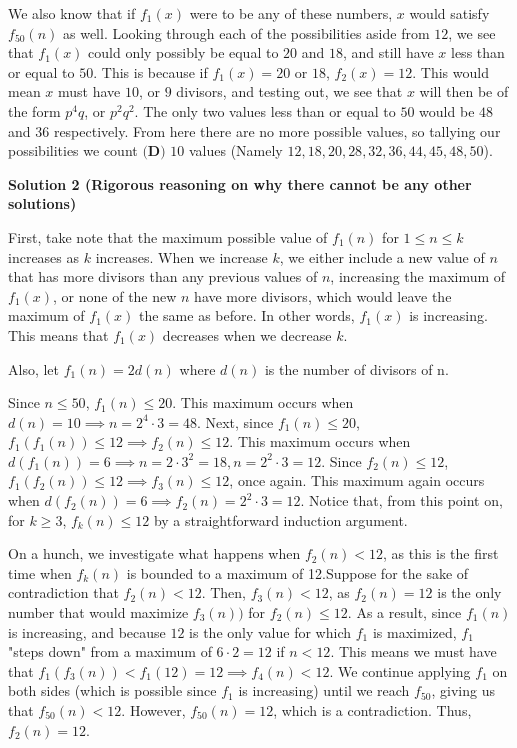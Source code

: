 \begin{enumerate}
 We also know that if $f_1(x)$ were to be any of these numbers, $x$ would satisfy $f_{50}(n)$ as well. Looking through each of the possibilities aside from $12$, we see that $f_1(x)$ could only possibly be equal to $20$ and $18$, and still have $x$ less than or equal to $50$. This is because if $f_1(x)=20$ or $18$, $f_2 (x) = 12$. This would mean $x$ must have $10$, or $9$ divisors, and testing out, we see that $x$ will then be of the form $p^4q$, or $p^2q^2$. The only two values less than or equal to $50$ would be $48$ and $36$ respectively. From here there are no more possible values, so tallying our possibilities we count $\boxed{\textbf{(D) }10}$ values (Namely $12,18,20,28,32,36,44,45,48,50$).

 



\textbf{Solution 2 (Rigorous reasoning on why there cannot be any other solutions)}

First, take note that the maximum possible value of $f_1(n)$ for $1 \le n \le k$ increases as $k$ increases. When we increase $k$, we either include a new value of $n$ that has more divisors than any previous values of $n$, increasing the maximum of $f_1(x)$, or none of the new $n$ have more divisors, which would leave the maximum of $f_1(x)$ the same as before. In other words, $f_1(x)$ is increasing. This means that $f_1(x)$ decreases when we decrease $k$. 

 Also, let $f_1(n) = 2d(n)$ where $d(n)$ is the number of divisors of n.

 Since $n \le 50$, $f_1(n) \le 20$. This maximum occurs when $d(n) = 10 \implies n = 2^4 \cdot 3 = 48$. Next, since $f_1(n) \le 20$, $f_1(f_1(n)) \le 12 \implies f_2(n) \le 12$. This maximum occurs when $d(f_1(n)) = 6 \implies n = 2 \cdot 3^2 = 18, n = 2^2 \cdot 3 = 12$. Since $f_2(n) \le 12$, $f_1(f_2(n)) \le 12 \implies f_3(n) \le 12$, once again. This maximum again occurs when $d(f_2(n)) = 6 \implies f_2(n) = 2^2 \cdot 3 = 12$. Notice that, from this point on, for $k \geq 3$, $f_k(n) \leq 12$ by a straightforward induction argument.

 On a hunch, we investigate what happens when $f_2(n) < 12$, as this is the first time when $f_k(n)$ is bounded to a maximum of 12.Suppose for the sake of contradiction that $f_2(n) < 12$. Then, $f_3(n) < 12$, as $f_2(n) = 12$ is the only number that would maximize $f_3(n))$ for $f_2(n) \le 12$. As a result, since $f_1(n)$ is increasing, and because $12$ is the only value for which $f_1$  is maximized, $f_1$ "steps down" from a maximum of $6 \cdot 2 = 12$ if $n < 12$. This means we must have that $f_1(f_3(n)) < f_1(12) = 12 \implies f_4(n) < 12$. We continue applying $f_1$ on both sides (which is possible since $f_1$ is increasing) until we reach $f_{50}$, giving us that $f_{50}(n) < 12$. However, $f_{50}(n) = 12$, which is a contradiction. Thus, $f_2(n) = 12$. 


\end{enumerate}
